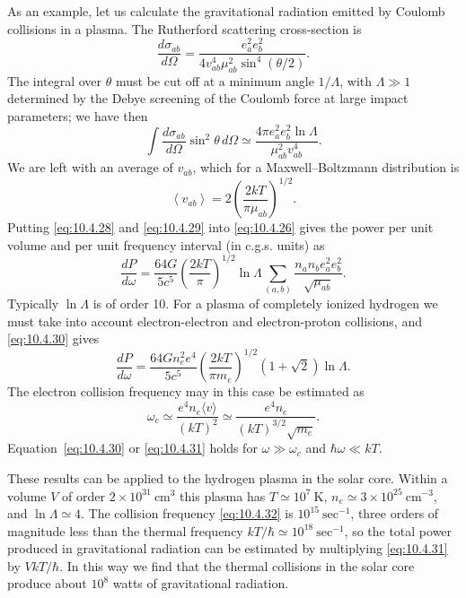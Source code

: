 As an example, let us calculate the gravitational radiation emitted by
Coulomb collisions in a plasma. The Rutherford scattering cross-section is
\begin{equation}
  \frac{d\sigma_{ab}}{d\Omega}
  =
  \frac{e_a^2e_b^2}
       {4v_{ab}^4\mu_{ab}^2\sin^4(\theta/2)}.
  \tag{10.4.27}\label{eq:10.4.27}
\end{equation}
The integral over \(\theta\) must be cut off at a minimum angle
\(1/\Lambda\), with \(\Lambda\gg1\) determined by the Debye screening of
the Coulomb force at large impact parameters; we have then
\begin{equation}
  \int\frac{d\sigma_{ab}}{d\Omega}\sin^2\theta\,d\Omega
  \simeq
  \frac{4\pi e_a^2e_b^2\ln\Lambda}
       {\mu_{ab}^2v_{ab}^4}.
  \tag{10.4.28}\label{eq:10.4.28}
\end{equation}
We are left with an average of \(v_{ab}\), which for a Maxwell--Boltzmann
distribution is
\begin{equation}
  \left\langle v_{ab}\right\rangle
  =
  2\left(\frac{2kT}{\pi\mu_{ab}}\right)^{1/2}.
  \tag{10.4.29}\label{eq:10.4.29}
\end{equation}
Putting \eqref{eq:10.4.28} and \eqref{eq:10.4.29} into
\eqref{eq:10.4.26} gives the power per unit volume and per unit frequency
interval (in c.g.s. units) as
\begin{equation}
  \frac{dP}{d\omega}
  =
  \frac{64G}{5c^5}
  \left(\frac{2kT}{\pi}\right)^{1/2}
  \ln\Lambda
  \sum_{(a,b)}
  \frac{n_an_be_a^2e_b^2}{\sqrt{\mu_{ab}}}.
  \tag{10.4.30}\label{eq:10.4.30}
\end{equation}
Typically \(\ln\Lambda\) is of order 10. For a plasma of completely ionized
hydrogen we must take into account electron-electron and electron-proton
collisions, and \eqref{eq:10.4.30} gives
\begin{equation}
  \frac{dP}{d\omega}
  =
  \frac{64Gn_e^2e^4}{5c^5}
  \left(\frac{2kT}{\pi m_e}\right)^{1/2}
  (1+\sqrt2)\ln\Lambda.
  \tag{10.4.31}\label{eq:10.4.31}
\end{equation}
The electron collision frequency may in this case be estimated as
\begin{equation}
  \omega_c
  \simeq
  \frac{e^4n_e\langle v\rangle}{(kT)^2}
  \simeq
  \frac{e^4n_e}{(kT)^{3/2}\sqrt{m_e}}.
  \tag{10.4.32}\label{eq:10.4.32}
\end{equation}
Equation~\eqref{eq:10.4.30} or \eqref{eq:10.4.31} holds for
\(\omega\gg\omega_c\) and \(\hbar\omega\ll kT\).

These results can be applied to the hydrogen plasma in the solar core. Within
a volume \(V\) of order \(2\times10^{31}\ \mathrm{cm}^3\) this plasma has
\(T\simeq10^7\ {\mathrm{K}}\), \(n_e\simeq3\times10^{25}\ \mathrm{cm}^{-3}\),
and \(\ln\Lambda\simeq4\). The collision frequency \eqref{eq:10.4.32} is
\(10^{15}\ \mathrm{sec}^{-1}\), three orders of magnitude less than the
thermal frequency \(kT/\hbar\simeq10^{18}\ \mathrm{sec}^{-1}\), so the total
power produced in gravitational radiation can be estimated by multiplying
\eqref{eq:10.4.31} by \(VkT/\hbar\). In this way we find that the thermal
collisions in the solar core produce about \(10^8\) watts of gravitational
radiation.
